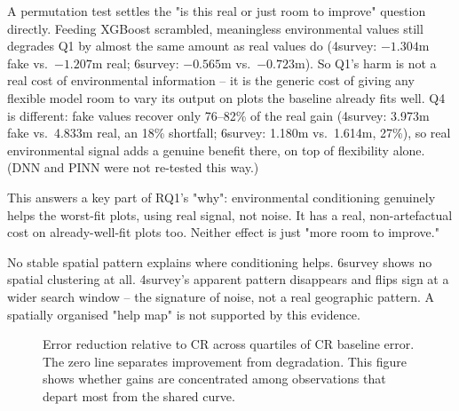 A permutation test settles the "is this real or just room to improve" question directly. Feeding
XGBoost scrambled, meaningless environmental values still degrades Q1 by almost the same amount as
real values do (4survey: $-1.304$m fake vs.\ $-1.207$m real; 6survey: $-0.565$m vs.\ $-0.723$m).
So Q1's harm is not a real cost of environmental information -- it is the generic cost of giving
any flexible model room to vary its output on plots the baseline already fits well. Q4 is
different: fake values recover only 76--82\% of the real gain (4survey: 3.973m fake vs.\ 4.833m
real, an 18\% shortfall; 6survey: 1.180m vs.\ 1.614m, 27\%), so real environmental signal adds a
genuine benefit there, on top of flexibility alone. (DNN and PINN were not re-tested this way.)

This answers a key part of RQ1's "why": environmental conditioning genuinely helps the worst-fit
plots, using real signal, not noise. It has a real, non-artefactual cost on already-well-fit
plots too. Neither effect is just "more room to improve."

No stable spatial pattern explains where conditioning helps. 6survey shows no spatial clustering
at all. 4survey's apparent pattern disappears and flips sign at a wider search window -- the
signature of noise, not a real geographic pattern. A spatially organised "help map" is not
supported by this evidence.


\begin{figure}[!htbp]
\centering
{}
\caption{Error reduction relative to CR across quartiles of CR baseline error. The zero line
separates improvement from degradation. This figure shows whether gains are concentrated among
observations that depart most from the shared curve.}
\label{fig:cr-error-quartiles}
\end{figure}


